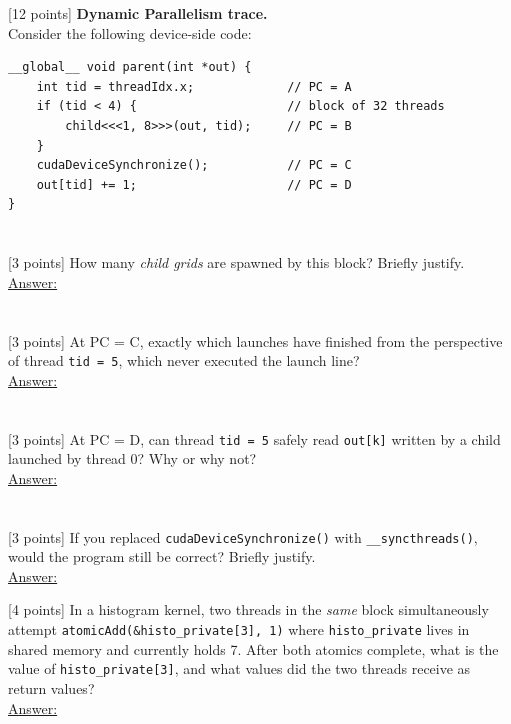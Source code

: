 \documentclass[12pt]{exam}
\newcommand{\Ans}{\underline{Answer:}\ }
\newcommand{\paragraphbox}[1]{\framebox[\linewidth]{\rule{0pt}{#1}}}
\begin{document}
\begin{questions}
\newpage
\question {}[12 points] \textbf{Dynamic Parallelism trace.}\\
Consider the following device-side code:

\begin{Verbatim}[xleftmargin=1em]
__global__ void parent(int *out) {
    int tid = threadIdx.x;             // PC = A
    if (tid < 4) {                     // block of 32 threads
        child<<<1, 8>>>(out, tid);     // PC = B
    }
    cudaDeviceSynchronize();           // PC = C
    out[tid] += 1;                     // PC = D
}
\end{Verbatim}

\begin{parts}
  \part {}[3 points] How many \emph{child grids} are spawned by this block? Briefly justify.\\[8pt]
        \Ans \paragraphbox{2.0cm}
  \part {}[3 points] At PC = C, exactly which launches have finished from the perspective of
        thread \texttt{tid = 5}, which never executed the launch line?\\[8pt]
        \Ans \paragraphbox{2.0cm}
  \part {}[3 points] At PC = D, can thread \texttt{tid = 5} safely read \texttt{out[k]} written
        by a child launched by thread 0? Why or why not?\\[8pt]
        \Ans \paragraphbox{2.0cm}
  \part {}[3 points] If you replaced \texttt{cudaDeviceSynchronize()} with \texttt{\_\_syncthreads()},
        would the program still be correct? Briefly justify.\\[8pt]
        \Ans \paragraphbox{2.0cm}
\end{parts}

\vspace{14pt}
\question {}[4 points] In a histogram kernel, two threads in the \emph{same} block simultaneously
attempt \texttt{atomicAdd(\&histo\_private[3], 1)} where \texttt{histo\_private} lives in shared
memory and currently holds 7. After both atomics complete, what is the value of
\texttt{histo\_private[3]}, and what values did the two threads receive as return values?\\[10pt]
\Ans \paragraphbox{2.6cm}

\end{questions}
\end{document}
